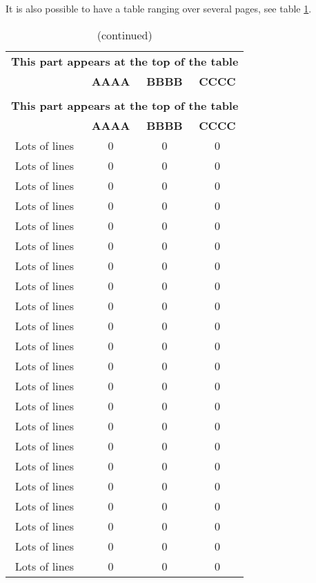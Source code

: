 It is also possible to have a table ranging over several pages, see table
\ref{tab:SeveralPgs}.

\begin{longtable}{@{\extracolsep{\fill}}cccc}
\caption{Table ranging over several pages}
\label{tab:SeveralPgs}
\\
%
\toprule
\toprule
%
\multicolumn{4}{c}{\textbf{This part appears at the top of the table}}\\
 & \textbf{AAAA} & \textbf{BBBB} & \textbf{CCCC} \\
%
\midrule
%
\endfirsthead
\caption{(continued)}\\
%
\toprule
\toprule
%
\multicolumn{4}{c}{\textbf{This part appears at the top of the table}}\\
 & \textbf{AAAA} & \textbf{BBBB} & \textbf{CCCC} \\
%
\midrule
%
\endhead
\bottomrule
\bottomrule
%
\endfoot
%
Lots of lines & 0 & 0 & 0 \\
Lots of lines & 0 & 0 & 0 \\
Lots of lines & 0 & 0 & 0 \\
Lots of lines & 0 & 0 & 0 \\
Lots of lines & 0 & 0 & 0 \\
Lots of lines & 0 & 0 & 0 \\
Lots of lines & 0 & 0 & 0 \\
Lots of lines & 0 & 0 & 0 \\
Lots of lines & 0 & 0 & 0 \\
Lots of lines & 0 & 0 & 0 \\
Lots of lines & 0 & 0 & 0 \\
Lots of lines & 0 & 0 & 0 \\
Lots of lines & 0 & 0 & 0 \\
Lots of lines & 0 & 0 & 0 \\
Lots of lines & 0 & 0 & 0 \\
Lots of lines & 0 & 0 & 0 \\
Lots of lines & 0 & 0 & 0 \\
Lots of lines & 0 & 0 & 0 \\
Lots of lines & 0 & 0 & 0 \\
Lots of lines & 0 & 0 & 0 \\
Lots of lines & 0 & 0 & 0 \\
Lots of lines & 0 & 0 & 0 \\

\end{longtable}
